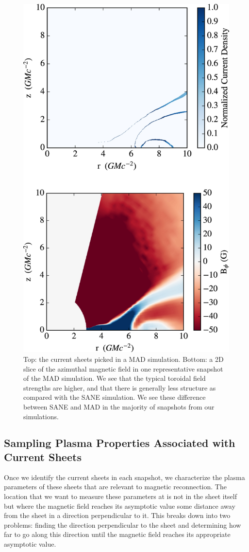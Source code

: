 \begin{figure}[!h]
	\centering
	\includegraphics[width =.6\textwidth]{paper2_fig2.jpg}
	\caption{Top: the current sheets picked in a MAD simulation.  Bottom: a 2D slice of the azimuthal magnetic field in one representative snapshot of the MAD simulation.  We see that the typical toroidal field strengths are higher, and that there is generally less structure as compared with the SANE simulation.  We see these difference between SANE and MAD in the majority of snapshots from our simulations.}
	\label{MAD_snapshot}
\end{figure}

\subsection{Sampling Plasma Properties Associated with Current Sheets}
Once we identify the current sheets in each snapshot,
we characterize the plasma parameters of these sheets
that are relevant to magnetic reconnection. The location
that we want to measure these parameters at is not in
the sheet itself but where the magnetic field reaches its
asymptotic value some distance away from the sheet in
a direction perpendicular to it. This breaks down into
two problems: finding the direction perpendicular to the
sheet and determining how far to go along this direction
until the magnetic field reaches its appropriate asymptotic value. 

